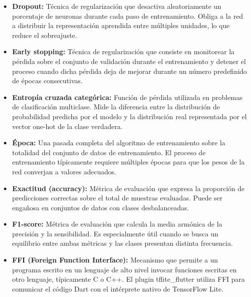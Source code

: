 \begin{itemize}
    \item[] \textbf{Dropout:} Técnica de regularización que desactiva aleatoriamente un porcentaje de neuronas durante cada paso de entrenamiento. Obliga a la red a distribuir la representación aprendida entre múltiples unidades, lo que reduce el sobreajuste.\\

    \item[] \textbf{Early stopping:} Técnica de regularización que consiste en monitorear la pérdida sobre el conjunto de validación durante el entrenamiento y detener el proceso cuando dicha pérdida deja de mejorar durante un número predefinido de épocas consecutivas.\\

    \item[] \textbf{Entropía cruzada categórica:} Función de pérdida utilizada en problemas de clasificación multiclase. Mide la diferencia entre la distribución de probabilidad predicha por el modelo y la distribución real representada por el vector one-hot de la clase verdadera.\\

    \item[] \textbf{Época:} Una pasada completa del algoritmo de entrenamiento sobre la totalidad del conjunto de datos de entrenamiento. El proceso de entrenamiento típicamente requiere múltiples épocas para que los pesos de la red converjan a valores adecuados.\\

    \item[] \textbf{Exactitud (accuracy):} Métrica de evaluación que expresa la proporción de predicciones correctas sobre el total de muestras evaluadas. Puede ser engañosa en conjuntos de datos con clases desbalanceadas.\\

    \item[] \textbf{F1-score:} Métrica de evaluación que calcula la media armónica de la precisión y la sensibilidad. Es especialmente útil cuando se busca un equilibrio entre ambas métricas y las clases presentan distinta frecuencia.\\

    \item[] \textbf{FFI (Foreign Function Interface):} Mecanismo que permite a un programa escrito en un lenguaje de alto nivel invocar funciones escritas en otro lenguaje, típicamente C o C++. El plugin tflite\_flutter utiliza FFI para comunicar el código Dart con el intérprete nativo de TensorFlow Lite.\\


\end{itemize}

